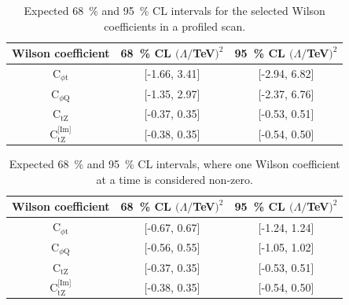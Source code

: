 \documentclass[letterpaper,11pt]{article}
\def\ctZ{C$_\text{tZ}$\xspace}
\def\ctZI{C$_\text{tZ}^\text{[Im]}$\xspace}
\def\cpt{C$_{\phi \text{t}}$\xspace}
\def\cpQM{C$_{\phi \text{Q}}$\xspace}
\def\TeV{TeV\xspace}
\begin{document}
\begin{table}[h]
\caption{Expected 68~\% and 95~\% CL intervals for the selected Wilson coefficients in a profiled scan.}\label{tab:proflimits}
\begin{center}
\begin{tabular}{c|c|c}
\hline
Wilson coefficient & 68~\% CL $(\Lambda/$\TeV$)^2$ & 95~\% CL $(\Lambda/$\TeV$)^2$ \\
\hline
\hline
\cpt   & [-1.66, 3.41]                 & [-2.94, 6.82]                 \\ 
\hline
\cpQM  & [-1.35, 2.97]                 & [-2.37, 6.76]                 \\ 
\hline
\ctZ   & [-0.37, 0.35]                 & [-0.53, 0.51]                 \\ 
\hline
\ctZI  & [-0.38, 0.35]                 & [-0.54, 0.50]                 \\ 
\hline
\end{tabular}
\end{center}
\end{table}

\begin{table}[h]
\caption{Expected 68~\% and 95~\% CL intervals, where one Wilson coefficient at a time is considered non-zero.}\label{tab:limits}
\begin{center}
\begin{tabular}{c|c|c}
\hline
Wilson coefficient & 68~\% CL $(\Lambda/$\TeV$)^2$ & 95~\% CL $(\Lambda/$\TeV$)^2$ \\
\hline
\hline
\cpt  & [-0.67, 0.67]                 & [-1.24, 1.24]                 \\
\hline
\cpQM & [-0.56, 0.55]                 & [-1.05, 1.02]                 \\
\hline
\ctZ  & [-0.37, 0.35]                 & [-0.53, 0.51]                 \\
\hline
\ctZI & [-0.38, 0.35]                 & [-0.54, 0.50]                 \\
\hline
\end{tabular}
\end{center}
\end{table}
\end{document}
